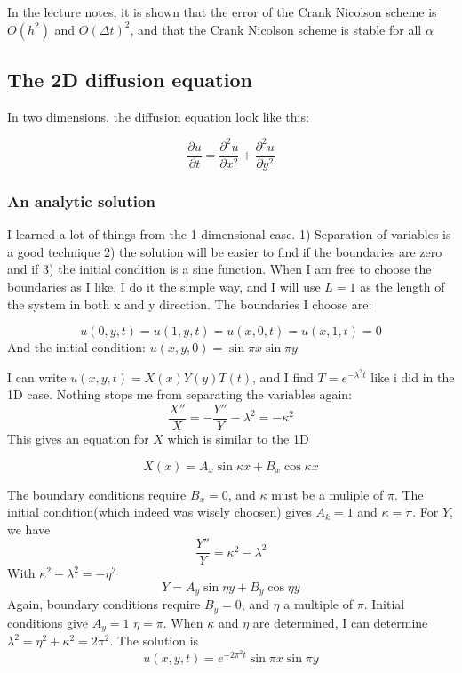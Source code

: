 \documentclass{article}
\begin{document}
In the lecture notes, it is shown that the error of the Crank Nicolson scheme is $O(h^2)$ and $O(\Delta t)^2$, and that the Crank Nicolson scheme is stable for all $\alpha$
\subsection{The 2D diffusion equation}

In two dimensions, the diffusion equation look like this: 

\begin{equation*}
\frac{\partial u}{\partial t} = \frac{\partial^2 u}{\partial x^2}+\frac{\partial^2 u}{\partial y^2}
\end{equation*}

\subsubsection{An analytic solution}
I learned a lot of things from the 1 dimensional case. 1) Separation of variables is a good technique 2) the solution will be easier to find if the boundaries are zero and if 3) the initial condition is a sine function. When I am free to choose the boundaries as I like, I do it the simple way, and I will use $L=1$ as the length of the system in both x and y direction. The boundaries I choose are:

$$u(0,y,t)=u(1,y,t)=u(x,0,t)=u(x,1,t)=0$$
And the initial condition: $u(x,y,0) = \sin \pi x \sin \pi y$

I can write $u(x,y,t) = X(x) Y(y) T(t)$, and I find $T=e^{-\lambda^2 t}$ like i did in the 1D case. Nothing stops me from separating the variables again:
$$
\frac{X''}{X}= -\frac{Y''}{Y}-\lambda^2 = -\kappa^2
$$
This gives an equation for $X$ which is similar to the 1D

$$
X(x) = A_x \sin \kappa x + B_x \cos \kappa x
$$

The boundary conditions require $B_x = 0$, and $\kappa$ must be a muliple of $\pi$. The initial condition(which indeed was wisely choosen) gives $A_k =1$ and $\kappa = \pi$. For $Y$, we have
$$\frac{Y''}{Y}= \kappa^2 -\lambda^2 $$
With $ \kappa^2 -\lambda^2 = -\eta ^2$
$$Y = A_y \sin \eta y +B_y \cos \eta y$$
Again, boundary conditions require $B_y = 0$, and $\eta$ a multiple of $\pi$. Initial conditions give $A_y = 1$ $\eta = \pi$. When $\kappa$ and $\eta$ are determined, I can determine $\lambda^2= \eta^2+\kappa^2=2\pi ^2 $. The solution is
\begin{equation}
u(x,y,t) = e^{-2\pi^2 t}\sin \pi x \sin \pi y
\end{equation}
\end{document}
